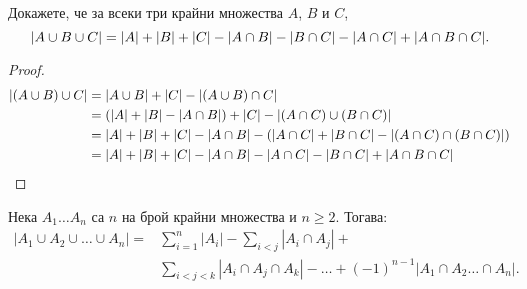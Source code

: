 \begin{prop}
  Докажете, че за всеки три крайни множества $A$, $B$ и $C$,
  \[\lvert{A\cup B \cup C}\rvert = \lvert{A}\rvert+\lvert{B}\rvert+\lvert{C}\rvert - \lvert{A\cap B}\rvert - \lvert{B\cap C}\rvert - \lvert{A\cap C}\rvert+ \lvert{A\cap B \cap C}\rvert.\]
\end{prop}
\begin{proof}
  \begin{align*}
    \lvert{(A \cup B) \cup C}\rvert & = \lvert{A \cup B}\rvert + \lvert{C}\rvert - \lvert{(A\cup B)\cap C}\rvert\\
    & = (\lvert{A}\rvert + \lvert{B}\rvert - \lvert{A\cap B}\rvert) + \lvert{C}\rvert - \lvert{(A\cap C)\cup(B\cap C)}\rvert\\
    & = \lvert{A}\rvert + \lvert{B}\rvert + \lvert{C}\rvert - \lvert{A\cap B}\rvert - (\lvert{A\cap C}\rvert + \lvert{B\cap C}\rvert - \lvert{(A\cap C) \cap (B\cap C)}\rvert)\\
    & = \lvert{A}\rvert + \lvert{B}\rvert + \lvert{C}\rvert - \lvert{A\cap B}\rvert - \lvert{A\cap C}\rvert - \lvert{B\cap C}\rvert + \lvert{A\cap B \cap C}\rvert
  \end{align*}
\end{proof}


\begin{framed}
\begin{thm}
  Нека $A_1\dots A_n$ са $n$ на брой крайни множества и $n\geq 2$. Тогава:
  \begin{align*}
    |A_1\cup A_2\cup \dots \cup A_n| = & \sum^n_{i=1} |A_i| - \sum_{i < j} |A_{i}\cap A_{j}| + \\
    & \sum_{i < j < k} |A_{i}\cap A_{j}\cap A_{k}|- \dots + (-1)^{n-1}|A_1 \cap A_2\dots \cap A_n|.    
  \end{align*}
\end{thm}
\end{framed}

